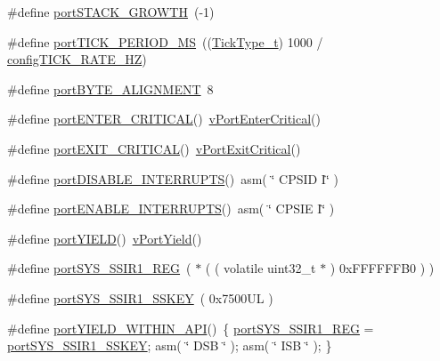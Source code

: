 \begin{DoxyCompactItemize}
\#define \hyperlink{CCS_2ARM__Cortex-R4_2portmacro_8h_a21adaab1601f6a0f35ba550a43060830}{port\-S\-T\-A\-C\-K\-\_\-\-G\-R\-O\-W\-T\-H}~(-\/1)
\item 
\#define \hyperlink{CCS_2ARM__Cortex-R4_2portmacro_8h_a554d9322ce7f698a86a22b21234bd8cd}{port\-T\-I\-C\-K\-\_\-\-P\-E\-R\-I\-O\-D\-\_\-\-M\-S}~((\hyperlink{Flsh186_2prtmacro_8h_aa69c48c6e902ce54f70886e6573c92a9}{Tick\-Type\-\_\-t}) 1000 / \hyperlink{FreeRTOSConfig_8h_a2f0258dd1e3b877e5bc013be54c2db6a}{config\-T\-I\-C\-K\-\_\-\-R\-A\-T\-E\-\_\-\-H\-Z})
\item 
\#define \hyperlink{CCS_2ARM__Cortex-R4_2portmacro_8h_ab9091ce3940d8bd93ec850122a2c6a1c}{port\-B\-Y\-T\-E\-\_\-\-A\-L\-I\-G\-N\-M\-E\-N\-T}~8
\item 
\#define \hyperlink{CCS_2ARM__Cortex-R4_2portmacro_8h_a8a09321ad004019f3c8d0f2e4d7224c7}{port\-E\-N\-T\-E\-R\-\_\-\-C\-R\-I\-T\-I\-C\-A\-L}()~\hyperlink{Tasking_2ARM__CM4F_2portmacro_8h_a2ed3554a3de09a3bd09d396ee081ab69}{v\-Port\-Enter\-Critical}()
\item 
\#define \hyperlink{CCS_2ARM__Cortex-R4_2portmacro_8h_a529358e6147881dd881c890ade21c9bd}{port\-E\-X\-I\-T\-\_\-\-C\-R\-I\-T\-I\-C\-A\-L}()~\hyperlink{Tasking_2ARM__CM4F_2portmacro_8h_aed20ada05b957181a0de042802a82a5b}{v\-Port\-Exit\-Critical}()
\item 
\#define \hyperlink{CCS_2ARM__Cortex-R4_2portmacro_8h_a6e3d10ee1a0734a647ca192523c2cfc1}{port\-D\-I\-S\-A\-B\-L\-E\-\_\-\-I\-N\-T\-E\-R\-R\-U\-P\-T\-S}()~asm( \char`\"{} C\-P\-S\-I\-D I\char`\"{} )
\item 
\#define \hyperlink{CCS_2ARM__Cortex-R4_2portmacro_8h_abc47e85a6befbb47961ad5ee7aa57173}{port\-E\-N\-A\-B\-L\-E\-\_\-\-I\-N\-T\-E\-R\-R\-U\-P\-T\-S}()~asm( \char`\"{} C\-P\-S\-I\-E I\char`\"{} )
\item 
\#define \hyperlink{CCS_2ARM__Cortex-R4_2portmacro_8h_ae1ff06193615f5130b5a97dc9e708fc7}{port\-Y\-I\-E\-L\-D}()~\hyperlink{WizC_2PIC18_2port_8c_add01c927fb689f7ec170e42d47d27927}{v\-Port\-Yield}()
\item 
\#define \hyperlink{CCS_2ARM__Cortex-R4_2portmacro_8h_a184472c2250fcc96e2e6935ac47301f0}{port\-S\-Y\-S\-\_\-\-S\-S\-I\-R1\-\_\-\-R\-E\-G}~( $\ast$ ( ( volatile uint32\-\_\-t $\ast$ ) 0x\-F\-F\-F\-F\-F\-F\-B0 ) )
\item 
\#define \hyperlink{CCS_2ARM__Cortex-R4_2portmacro_8h_ad501ea9fe336e813daa7a34e43697d2d}{port\-S\-Y\-S\-\_\-\-S\-S\-I\-R1\-\_\-\-S\-S\-K\-E\-Y}~( 0x7500\-U\-L )
\item 
\#define \hyperlink{CCS_2ARM__Cortex-R4_2portmacro_8h_a664746b0d63d7f84baf1092ff4feeef9}{port\-Y\-I\-E\-L\-D\-\_\-\-W\-I\-T\-H\-I\-N\-\_\-\-A\-P\-I}()~\{ \hyperlink{CCS_2ARM__Cortex-R4_2portmacro_8h_a184472c2250fcc96e2e6935ac47301f0}{port\-S\-Y\-S\-\_\-\-S\-S\-I\-R1\-\_\-\-R\-E\-G} = \hyperlink{CCS_2ARM__Cortex-R4_2portmacro_8h_ad501ea9fe336e813daa7a34e43697d2d}{port\-S\-Y\-S\-\_\-\-S\-S\-I\-R1\-\_\-\-S\-S\-K\-E\-Y};  asm( \char`\"{} D\-S\-B \char`\"{} ); asm( \char`\"{} I\-S\-B \char`\"{} ); \}

\end{DoxyCompactItemize}
